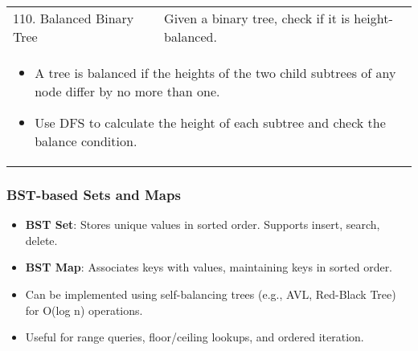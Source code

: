 \begin{summary}
\begin{center}
\begin{tabular}{ll}
            \midrule
            110. Balanced Binary Tree & Given a binary tree, check if it is height-balanced. \\
            \multicolumn{2}{p{\linewidth}}{
                \begin{itemize}
                    \item A tree is balanced if the heights of the two child subtrees of any node differ by no more than one.
                    \item Use DFS to calculate the height of each subtree and check the balance condition.
                \end{itemize}
            } \\
            \midrule
            \bottomrule
        \end{tabular}
    \end{center}
\end{summary}
\newpage

\subsubsection{BST-based Sets and Maps}

\begin{summary}
    \begin{itemize}
        \item \textbf{BST Set}: Stores unique values in sorted order. Supports insert, search, delete.
        \item \textbf{BST Map}: Associates keys with values, maintaining keys in sorted order.
        \item Can be implemented using self-balancing trees (e.g., AVL, Red-Black Tree) for O(log n) operations.
        \item Useful for range queries, floor/ceiling lookups, and ordered iteration.
    \end{itemize}
\end{summary}

